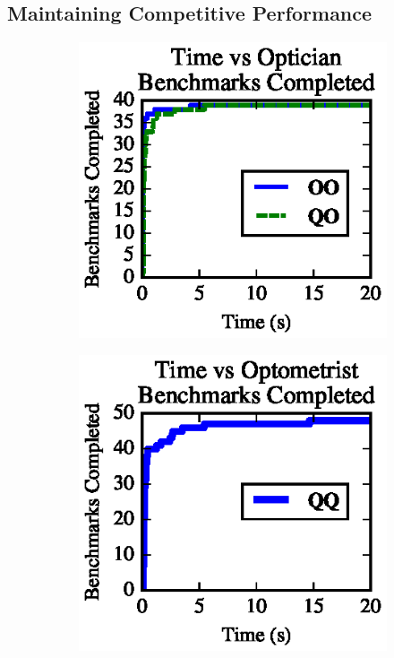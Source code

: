 \documentclass[acmsmall,review,anonymous]{acmart}
\begin{document}
\subsection{Maintaining Competitive Performance}

\begin{figure}[t]
\centering
\begin{subfigure}[b]{.49\textwidth}
\centering
\includegraphics{generated-graphs/times_opt}
\caption{}
\label{subfig:lenssize}
\end{subfigure}
\begin{subfigure}[b]{.49\textwidth}
\includegraphics{generated-graphs/times_new.eps}

\end{subfigure}
\end{figure}
\end{document}
